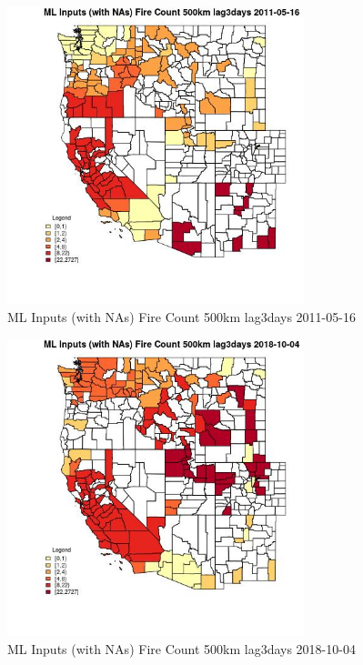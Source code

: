 \begin{figure} 
\centering  
\includegraphics[width=0.77\textwidth]{Code_Outputs/Report_ML_input_PM25_Step4_part_f_de_duplicated_aveswNAs_CountyFire_Count_500km_lag3daysMean2011-05-16.jpg} 
\caption{\label{fig:Report_ML_input_PM25_Step4_part_f_de_duplicated_aveswNAsCountyFire_Count_500km_lag3daysMean2011-05-16}ML Inputs (with NAs) Fire Count 500km lag3days 2011-05-16} 
\end{figure} 
 

\begin{figure} 
\centering  
\includegraphics[width=0.77\textwidth]{Code_Outputs/Report_ML_input_PM25_Step4_part_f_de_duplicated_aveswNAs_CountyFire_Count_500km_lag3daysMean2018-10-04.jpg} 
\caption{\label{fig:Report_ML_input_PM25_Step4_part_f_de_duplicated_aveswNAsCountyFire_Count_500km_lag3daysMean2018-10-04}ML Inputs (with NAs) Fire Count 500km lag3days 2018-10-04} 
\end{figure} 
 

